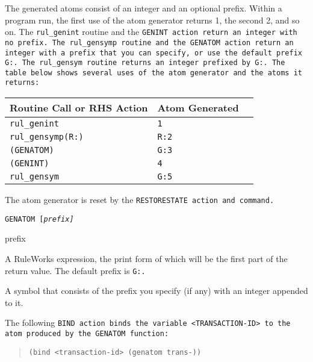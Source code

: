 The generated atoms consist of an integer and an optional
prefix. Within a program run, the first use of the atom generator
returns 1, the second 2, and so on. The \verb|rul_genint| routine and
the \tt{GENINT} action return an integer with no prefix. The
\verb|rul_gensymp| routine and the \tt{GENATOM} action return an
integer with a prefix that you can specify, or use the default prefix
\tt{G:}. The \verb|rul_gensym| routine returns an integer prefixed by
\tt{G:}. The table below shows several uses of the atom generator and
the atoms it returns:

\begin{center}
  \begin{tabular}{lll}
    \toprule
    Routine Call or RHS Action & Atom Generated \\
    \midrule
    \verb|rul_genint| &  \verb|1| \\
    \verb|rul_gensymp(R:)| & \verb|R:2| \\
    \verb|(GENATOM)| & \verb|G:3| \\
    \verb|(GENINT)| & \verb|4| \\
    \verb|rul_gensym| & \verb|G:5| \\
    \bottomrule
  \end{tabular}
\end{center}

The atom generator is reset by the \tt{RESTORESTATE} action and
command.

\Format

\tt{GENATOM} [\it{prefix}]

\begin{arguments}
\item[prefix]

  A RuleWorks expression, the print form of which will be the first
  part of the return value. The default prefix is \tt{G:}.
\end{arguments}

\ReturnValue

A symbol that consists of the prefix you specify (if any) with an
integer appended to it.

\Example

The following \tt{BIND} action binds the variable \tt{<TRANSACTION-ID>}
to the atom produced by the \tt{GENATOM} function:

\begin{quote}
\begin{verbatim}
(bind <transaction-id> (genatom trans-))
\end{verbatim}
\end{quote}

